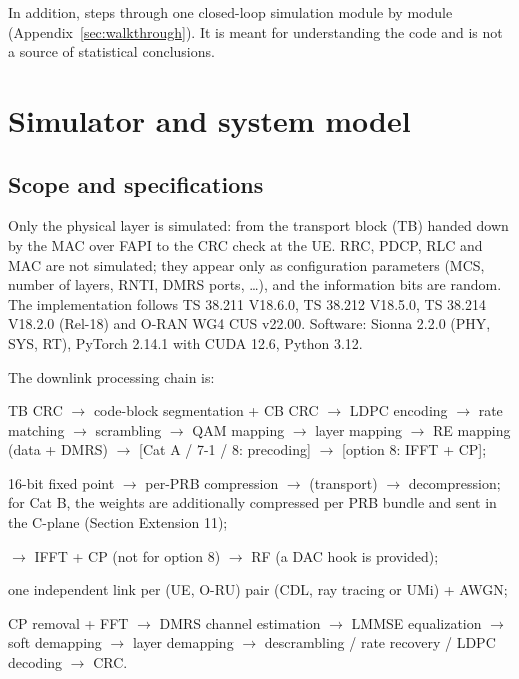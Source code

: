 \documentclass[11pt,a4paper]{article}
\DeclareRobustCommand{\code}[1]{\codeurl{#1}}  %
\begin{document}
In addition, \code{closed_loop_walkthrough.ipynb} steps through one closed-loop simulation module by module
(Appendix~\ref{sec:walkthrough}). It is meant for understanding the code and is not a source of statistical conclusions.

\section{Simulator and system model}

\subsection{Scope and specifications}

Only the physical layer is simulated: from the transport block (TB) handed down by the MAC over FAPI to the CRC check at the
UE. RRC, PDCP, RLC and MAC are not simulated; they appear only as configuration parameters (MCS, number of layers, RNTI, DMRS
ports, \ldots), and the information bits are random. The implementation follows TS 38.211 V18.6.0, TS 38.212 V18.5.0,
TS 38.214 V18.2.0 (Rel-18) and O-RAN WG4 CUS v22.00. Software: Sionna 2.2.0 (PHY, SYS, RT), PyTorch 2.14.1 with CUDA 12.6,
Python 3.12.

The downlink processing chain is:
\begin{description}[leftmargin=1.2em, style=nextline]
  \item[O-DU (High-PHY)] TB CRC $\to$ code-block segmentation + CB CRC $\to$ LDPC encoding $\to$ rate matching $\to$ scrambling
        $\to$ QAM mapping $\to$ layer mapping $\to$ RE mapping (data + DMRS) $\to$ [Cat A / 7-1 / 8: precoding]
        $\to$ [option 8: IFFT + CP];
  \item[Fronthaul] 16-bit fixed point $\to$ per-PRB compression $\to$ (transport) $\to$ decompression; for Cat B, the weights are
        additionally compressed per PRB bundle and sent in the C-plane (Section Extension 11);
  \item[O-RU (Low-PHY)] [Cat B: per-RE precoding with the received weights] $\to$ IFFT + CP (not for option 8) $\to$ RF
        (a DAC hook is provided);
  \item[Channel] one independent link per (UE, O-RU) pair (CDL, ray tracing or UMi) + AWGN;
  \item[UE] CP removal + FFT $\to$ DMRS channel estimation $\to$ LMMSE equalization $\to$ soft demapping $\to$ layer demapping
        $\to$ descrambling / rate recovery / LDPC decoding $\to$ CRC.
\end{description}
\end{document}
